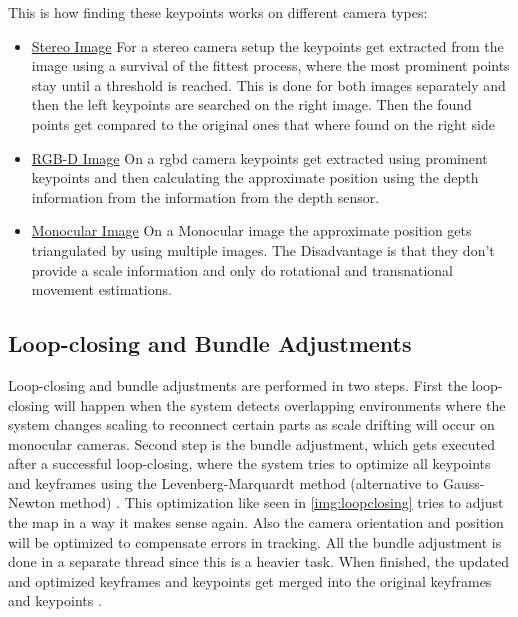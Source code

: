 This is how finding these keypoints works on different camera types:
\begin{itemize}
    \item \underline{Stereo Image} \newline
    For a stereo camera setup the keypoints get extracted from the image using a survival of the fittest process, where the most prominent points stay until a threshold is reached. This is done for both images separately and then the left keypoints are searched on the right image. Then the found points get compared to the original ones that where found on the right side
    \item \underline{RGB-D Image} \newline
    On a \gls{rgbd} camera keypoints get extracted using prominent keypoints and then calculating the approximate position using the depth information from the information from the depth sensor.
    \item \underline{Monocular Image} \newline
    On a Monocular image the approximate position gets triangulated by using multiple images. The Disadvantage is that they don't provide a scale information and only do rotational and transnational movement estimations.
\end{itemize}

\subsection{Loop-closing and Bundle Adjustments}
Loop-closing and bundle adjustments are performed in two steps. First the loop-closing will happen when the system detects overlapping environments where the system changes scaling to reconnect certain parts as scale drifting will occur on monocular cameras.\newline
Second step is the bundle adjustment, which gets executed after a successful loop-closing, where the system tries to optimize all keypoints and keyframes using the Levenberg-Marquardt method (alternative to Gauss-Newton method) \cite{LevenbergMarquardMethod}. This optimization like seen in \ref{img:loopclosing} tries to adjust the map in a way it makes sense again.  Also the camera orientation and position will be optimized to compensate errors in tracking. All the bundle adjustment is done in a separate thread since this is a heavier task.\newline
When finished, the updated and optimized keyframes and keypoints get merged into the original keyframes and keypoints \cite{orbslam2}.

